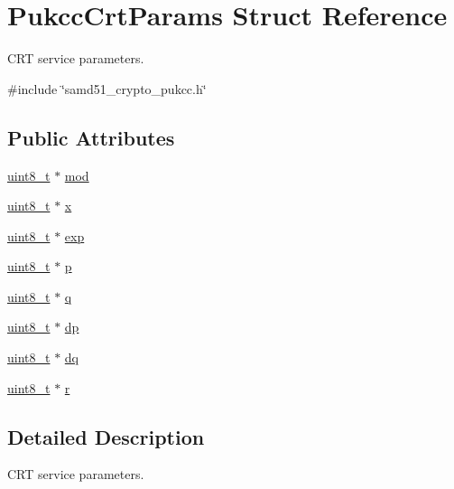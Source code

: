 \hypertarget{structPukccCrtParams}{}\section{Pukcc\+Crt\+Params Struct Reference}
\label{structPukccCrtParams}


C\+RT service parameters.  




{\ttfamily \#include \char`\"{}samd51\+\_\+crypto\+\_\+pukcc.\+h\char`\"{}}

\subsection*{Public Attributes}
\begin{DoxyCompactItemize}
\item 
\hyperlink{stdint_8h_aba7bc1797add20fe3efdf37ced1182c5}{uint8\+\_\+t} $\ast$ \hyperlink{structPukccCrtParams_a28cbf33af71a8582da79a64d53175bca}{mod}
\item 
\hyperlink{stdint_8h_aba7bc1797add20fe3efdf37ced1182c5}{uint8\+\_\+t} $\ast$ \hyperlink{structPukccCrtParams_a6c5224e7eeb561b0341976d0390ec44d}{x}
\item 
\hyperlink{stdint_8h_aba7bc1797add20fe3efdf37ced1182c5}{uint8\+\_\+t} $\ast$ \hyperlink{structPukccCrtParams_a8a0949e50242ef77f8778e7e79bf29ca}{exp}
\item 
\hyperlink{stdint_8h_aba7bc1797add20fe3efdf37ced1182c5}{uint8\+\_\+t} $\ast$ \hyperlink{structPukccCrtParams_ae5cd519c92bdbf2fb9b7e5e21a45b3f6}{p}
\item 
\hyperlink{stdint_8h_aba7bc1797add20fe3efdf37ced1182c5}{uint8\+\_\+t} $\ast$ \hyperlink{structPukccCrtParams_a6924a47a120a1720f717ef39f7160989}{q}
\item 
\hyperlink{stdint_8h_aba7bc1797add20fe3efdf37ced1182c5}{uint8\+\_\+t} $\ast$ \hyperlink{structPukccCrtParams_afe9cb1b2f9c9dc05c783f549775fcb9f}{dp}
\item 
\hyperlink{stdint_8h_aba7bc1797add20fe3efdf37ced1182c5}{uint8\+\_\+t} $\ast$ \hyperlink{structPukccCrtParams_a13b12b088c048b95c1f5dd13f30e6358}{dq}
\item 
\hyperlink{stdint_8h_aba7bc1797add20fe3efdf37ced1182c5}{uint8\+\_\+t} $\ast$ \hyperlink{structPukccCrtParams_af36c7ff183f7daaf25eb305381e517f2}{r}
\end{DoxyCompactItemize}


\subsection{Detailed Description}
C\+RT service parameters. 

